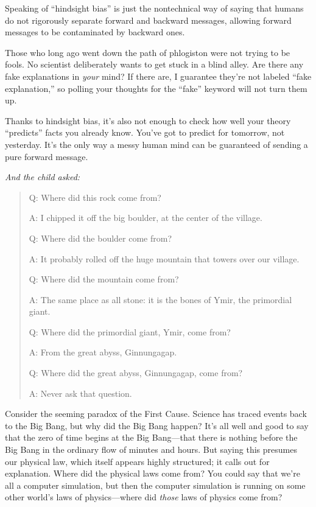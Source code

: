 {
 Speaking of ``hindsight bias''
is just the nontechnical way of saying that humans do not rigorously
separate forward and backward messages, allowing forward messages to be
contaminated by backward ones.}

{
 Those who long ago went down the path of phlogiston were not
trying to be fools. No scientist deliberately wants to get stuck in a
blind alley. Are there any fake explanations in \textit{your} mind? If
there are, I guarantee they're not labeled
``fake explanation,'' so polling
your thoughts for the ``fake''
keyword will not turn them up.}

{
 Thanks to hindsight bias, it's also not enough to
check how well your theory
``predicts'' facts you already know.
You've got to predict for tomorrow, not yesterday.
It's the only way a messy human mind can be guaranteed
of sending a pure forward message.}

\myendsectiontext


\bigskip

\label{semantic_stopsigns}

{
 \textit{And the child asked:}}

\begin{quote}
{
 Q: Where did this rock come from?}

{
 A: I chipped it off the big boulder, at the center of the
village.}

{
 Q: Where did the boulder come from?}

{
 A: It probably rolled off the huge mountain that towers over our
village.}

{
 Q: Where did the mountain come from?}

{
 A: The same place as all stone: it is the bones of Ymir, the
primordial giant.}

{
 Q: Where did the primordial giant, Ymir, come from?}

{
 A: From the great abyss, Ginnungagap.}

{
 Q: Where did the great abyss, Ginnungagap, come from?}

{
 A: Never ask that question.}
\end{quote}

{
 Consider the seeming paradox of the First Cause. Science has
traced events back to the Big Bang, but why did the Big Bang happen?
It's all well and good to say that the zero of time
begins at the Big Bang---that there is nothing before the Big Bang in
the ordinary flow of minutes and hours. But saying this presumes our
physical law, which itself appears highly structured; it calls out for
explanation. Where did the physical laws come from? You could say that
we're all a computer simulation, but then the computer
simulation is running on some other world's laws of
physics---where did \textit{those} laws of physics come from?}

